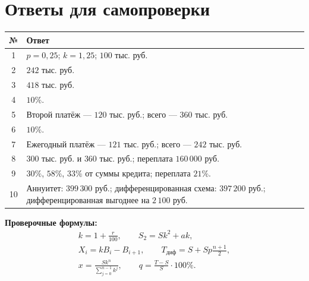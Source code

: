 \documentclass[a4paper,12pt]{article}
\begin{document}
\section*{Ответы для самопроверки}
\renewcommand{\arraystretch}{1.52}
\begin{tabularx}{\linewidth}{@{}cX@{}}
\toprule
№ & Ответ \\
\midrule
1 & \(p=0,25\); \(k=1,25\); \(100\) тыс. руб. \\
2 & \(242\) тыс. руб. \\
3 & \(418\) тыс. руб. \\
4 & \(10\%\). \\
5 & Второй платёж --- \(120\) тыс. руб.; всего --- \(360\) тыс. руб. \\
6 & \(10\%\). \\
7 & Ежегодный платёж --- \(121\) тыс. руб.; всего --- \(242\) тыс. руб. \\
8 & \(300\) тыс. руб. и \(360\) тыс. руб.; переплата \(160\,000\) руб. \\
9 & \(30\%\), \(58\%\), \(33\%\) от суммы кредита; переплата \(21\%\). \\
10 & Аннуитет: \(399\,300\) руб.; дифференцированная схема: \(397\,200\) руб.; дифференцированная выгоднее на \(2\,100\) руб. \\
\bottomrule
\end{tabularx}

\vspace{10mm}
\textbf{Проверочные формулы:}
\[
\begin{gathered}
 k=1+\frac r{100},\qquad S_2=Sk^2+ak,\\[4pt]
 X_i=kB_i-B_{i+1},\qquad
 T_{\text{диф}}=S+Sp\frac{n+1}{2},\\[4pt]
 x=\frac{Sk^n}{\sum_{j=0}^{n-1}k^j},\qquad
 q=\frac{T-S}{S}\cdot100\%.
\end{gathered}
\]
\end{document}

